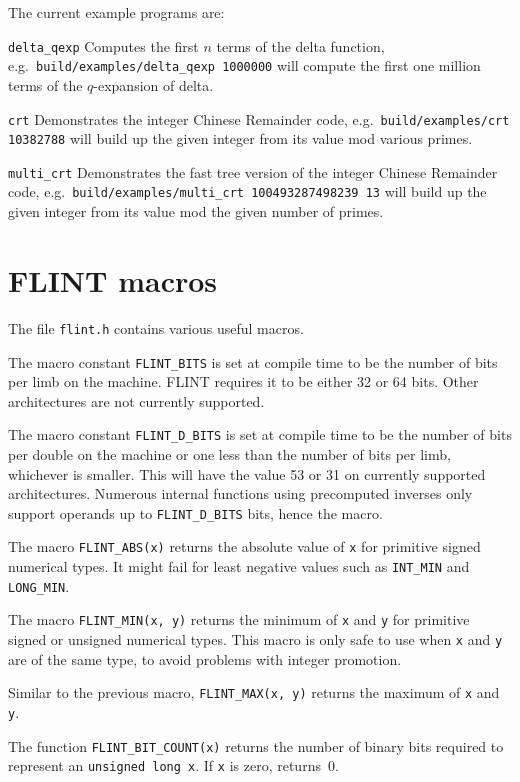 \documentclass[a4paper,10pt]{book}
\newcommand{\code}{\lstinline}
\begin{document}
The current example programs are:

\code{delta_qexp}  Computes the first $n$ terms of the delta function, e.g.\ 
\code{build/examples/delta_qexp 1000000} will compute the first one million terms of the 
$q$-expansion of delta.

\code{crt}  Demonstrates the integer Chinese Remainder code, e.g.\ 
\code{build/examples/crt 10382788} will build up the given integer from its value mod various
primes.

\code{multi_crt}  Demonstrates the fast tree version of the integer Chinese Remainder 
code, e.g.\ 
\code{build/examples/multi_crt 100493287498239 13} will build up the given integer from 
its value mod the given number of primes.

\chapter{FLINT macros}

The file \code{flint.h} contains various useful macros.

The macro constant \code{FLINT_BITS} is set at compile time to be the 
number of bits per limb on the machine.  FLINT requires it to be either 
32 or 64 bits.  Other architectures are not currently supported.

The macro constant \code{FLINT_D_BITS} is set at compile time to be the 
number of bits per double on the machine or one less than the number of 
bits per limb, whichever is smaller.  This will have the value 53 or 31 
on currently supported architectures.  Numerous internal functions using 
precomputed inverses only support operands up to \code{FLINT_D_BITS} bits, 
hence the macro.

The macro \code{FLINT_ABS(x)} returns the absolute value of \code{x}
for primitive signed numerical types.  It might fail for least negative 
values such as \code{INT_MIN} and \code{LONG_MIN}.

The macro \code{FLINT_MIN(x, y)} returns the minimum of \code{x} and 
\code{y} for primitive signed or unsigned numerical types.  This macro 
is only safe to use when \code{x} and \code{y} are of the same type, 
to avoid problems with integer promotion.

Similar to the previous macro, \code{FLINT_MAX(x, y)} returns the 
maximum of \code{x} and \code{y}.

The function \code{FLINT_BIT_COUNT(x)} returns the number of binary bits 
required to represent an \code{unsigned long x}.  If \code{x} is zero, 
returns~$0$.
\end{document}
